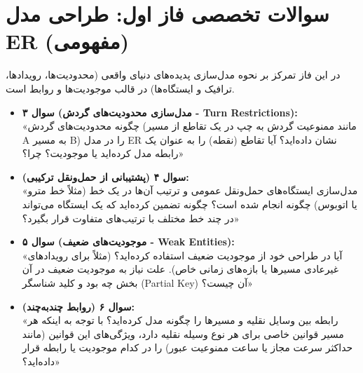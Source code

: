 \documentclass[12pt]{article}
\begin{document}
\section{سوالات تخصصی فاز اول: طراحی مدل ER (مفهومی)}
در این فاز تمرکز بر نحوه مدل‌سازی پدیده‌های دنیای واقعی (محدودیت‌ها، رویدادها، ترافیک و ایستگاه‌ها) در قالب موجودیت‌ها و روابط است.
\begin{itemize}[label=$\bullet$, leftmargin=*]
    \item \textbf{سوال ۳ (مدل‌سازی محدودیت‌های گردش - Turn Restrictions):} \\
    «چگونه محدودیت‌های گردش (مانند ممنوعیت گردش به چپ در یک تقاطع از مسیر A به مسیر B) را در مدل ER نشان داده‌اید؟ آیا تقاطع (نقطه) را به عنوان یک رابطه مدل کرده‌اید یا موجودیت؟ چرا؟»
    \item \textbf{سوال ۴ (پشتیبانی از حمل‌ونقل ترکیبی):} \\
    «مدل‌سازی ایستگاه‌های حمل‌ونقل عمومی و ترتیب آن‌ها در یک خط (مثلاً خط مترو یا اتوبوس) چگونه انجام شده است؟ چگونه تضمین کرده‌اید که یک ایستگاه می‌تواند در چند خط مختلف با ترتیب‌های متفاوت قرار بگیرد؟»
    \item \textbf{سوال ۵ (موجودیت‌های ضعیف - Weak Entities):} \\
    «آیا در طراحی خود از موجودیت ضعیف استفاده کرده‌اید؟ (مثلاً برای رویدادهای غیرعادی مسیرها یا بازه‌های زمانی خاص). علت نیاز به موجودیت ضعیف در آن بخش چه بود و کلید شناسگر (Partial Key) آن چیست؟»
    \item \textbf{سوال ۶ (روابط چندبه‌چند):} \\
    «رابطه بین وسایل نقلیه و مسیرها را چگونه مدل کرده‌اید؟ با توجه به اینکه هر مسیر قوانین خاصی برای هر نوع وسیله نقلیه دارد، ویژگی‌های این قوانین (مانند حداکثر سرعت مجاز یا ساعت ممنوعیت عبور) را در کدام موجودیت یا رابطه قرار داده‌اید؟»
\end{itemize}

\newpage
\end{document}
